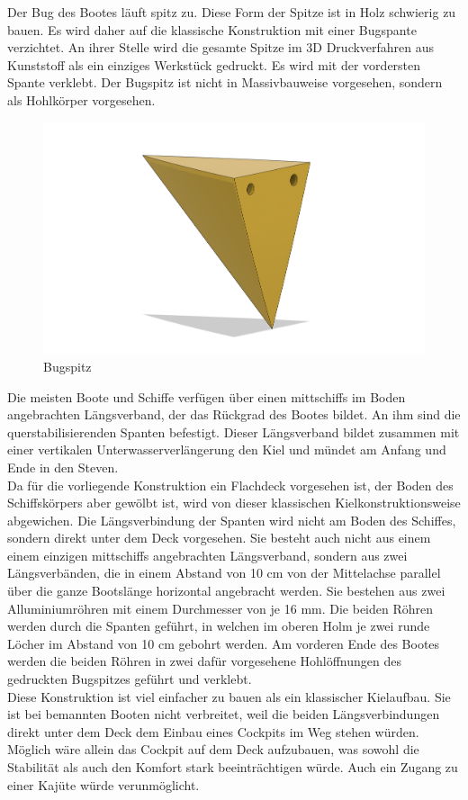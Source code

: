 Der Bug des Bootes läuft spitz zu. Diese Form der Spitze ist in Holz schwierig zu bauen. Es wird daher auf die klassische Konstruktion mit einer Bugspante verzichtet. An ihrer Stelle wird die gesamte Spitze im 3D Druckverfahren aus Kunststoff als ein einziges Werkstück gedruckt. Es wird mit der vordersten Spante verklebt. Der Bugspitz ist nicht in Massivbauweise vorgesehen, sondern als Hohlkörper vorgesehen.
\begin{figure}[H]
    \centering
    \includegraphics[width=0.8\linewidth]{assets/bug_spitz.png}
 \caption{Bugspitz}
    
\end{figure}
Die meisten Boote und Schiffe verfügen über einen mittschiffs im Boden angebrachten Längsverband, der das Rückgrad des Bootes bildet. An ihm sind die querstabilisierenden Spanten befestigt. Dieser Längsverband bildet zusammen mit einer vertikalen Unterwasserverlängerung den Kiel und mündet am Anfang und Ende in den Steven. 
\\
Da für die vorliegende Konstruktion ein Flachdeck vorgesehen ist, der Boden des Schiffskörpers aber gewölbt ist, wird von dieser klassischen Kielkonstruktionsweise abgewichen. Die Längsverbindung der Spanten wird nicht am Boden des Schiffes, sondern direkt unter dem Deck vorgesehen. Sie besteht auch nicht aus einem  einem einzigen mittschiffs angebrachten Längsverband, sondern aus zwei Längsverbänden, die in einem  Abstand von 10 cm von der Mittelachse parallel über die ganze Bootslänge horizontal angebracht werden. Sie bestehen aus zwei Alluminiumröhren mit einem Durchmesser von je 16 mm. Die beiden Röhren werden durch die Spanten geführt, in welchen im oberen Holm je zwei runde Löcher im Abstand von 10 cm gebohrt werden. Am vorderen Ende des Bootes werden die beiden Röhren in zwei dafür vorgesehene Hohlöffnungen des gedruckten Bugspitzes geführt und verklebt.
\\
Diese Konstruktion ist viel einfacher zu bauen als ein klassischer Kielaufbau.  Sie ist bei  bemannten Booten nicht verbreitet, weil die beiden Längsverbindungen direkt unter dem Deck dem Einbau eines Cockpits im Weg stehen würden. Möglich wäre allein das Cockpit auf dem Deck aufzubauen, was sowohl die Stabilität als auch den Komfort stark beeinträchtigen würde. Auch ein  Zugang zu einer Kajüte würde verunmöglicht. 
